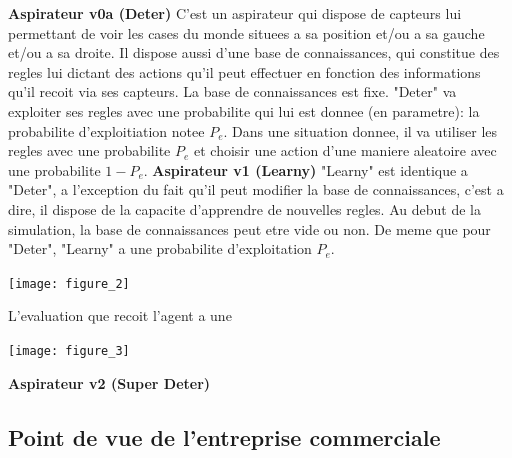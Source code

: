 \documentclass[12pt]{article}
\begin{document}
\justify
\textbf{Aspirateur v0a (Deter)}
\justify
C'est un aspirateur qui dispose de capteurs lui permettant de voir les cases du monde situees a sa position et/ou a sa gauche et/ou a sa droite. Il dispose aussi d'une base de connaissances, qui constitue des regles lui dictant des actions qu'il peut effectuer en fonction des informations qu'il recoit via ses capteurs. La base de connaissances est fixe. "Deter" va exploiter ses regles avec une probabilite qui lui est donnee (en parametre): la probabilite d'exploitiation notee $P_e$. Dans une situation donnee, il va utiliser les regles avec une probabilite $P_e$ et choisir une action d'une maniere aleatoire avec une probabilite $1-P_e$. 
\justify
\textbf{Aspirateur v1 (Learny)}
\justify
"Learny" est identique a "Deter", a l'exception du fait qu'il peut modifier la base de connaissances, c'est a dire, il dispose de la capacite d'apprendre de nouvelles regles. Au debut de la simulation, la base de connaissances peut etre vide ou non. De meme que pour "Deter", "Learny" a une probabilite d'exploitation $P_e$.
\begin{center}
\texttt{[image: figure\_2]}
\end{center}
\justify
L'evaluation que recoit l'agent a une 

\begin{center}
\texttt{[image: figure\_3]}
\end{center}

\justify

\justify
\textbf{Aspirateur v2 (Super Deter)}
\subsection{Point de vue de l'entreprise commerciale}
\end{document}

